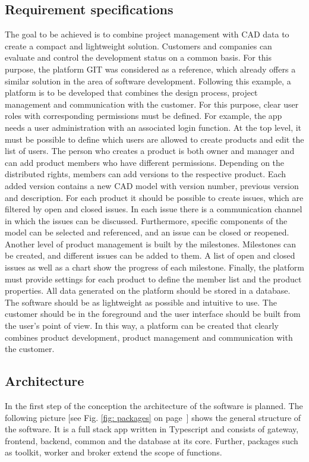     \subsection*{Requirement specifications}
    The goal to be achieved is to combine project management with CAD data to create a compact and lightweight solution. Customers and companies can evaluate and control the development status on a common basis. For this purpose, the platform GIT was considered as a reference, which already offers a similar solution in the area of software development. Following this example, a platform is to be developed that combines the design process, project management and communication with the customer. For this purpose, clear user roles with corresponding permissions must be defined. For example, the app needs a user administration with an associated login function. At the top level, it must be possible to define which users are allowed to create products and edit the list of users. The person who creates a product is both owner and manager and can add product members who have different permissions. Depending on the distributed rights, members can add versions to the respective product. Each added version contains a new CAD model with version number, previous version and description. For each product it should be possible to create issues, which are filtered by open and closed issues. In each issue there is a communication channel in which the issues can be discussed. Furthermore, specific components of the model can be selected and referenced, and an issue can be closed or reopened. Another level of product management is built by the milestones. Milestones can be created, and different issues can be added to them. A list of open and closed issues as well as a chart show the progress of each milestone. Finally, the platform must provide settings for each product to define the member list and the product properties. All data generated on the platform should be stored in a database. The software should be as lightweight as possible and intuitive to use. The customer should be in the foreground and the user interface should be built from the user's point of view. In this way, a platform can be created that clearly combines product development, product management and communication with the customer.

    \subsection*{Architecture}
    In the first step of the conception the architecture of the software is planned. The following picture [see Fig. \ref{fig: packages} on page~\pageref{fig: packages}] shows the general structure of the software. It is a full stack app written in Typescript and consists of gateway, frontend, backend, common and the database at its core. Further, packages such as toolkit, worker and broker extend the scope of functions.
    
